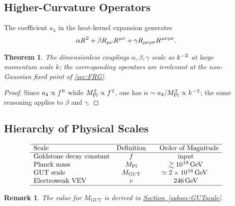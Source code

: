 \documentclass[pdflatex,sn-mathphys-num]{sn-jnl}
\theoremstyle{thmstyleone}
\newtheorem{theorem}{Theorem}
\theoremstyle{thmstyletwo}%
\newtheorem{remark}{Remark}%
\theoremstyle{thmstylethree}%
\newcommand{\sm}{\hspace{.065em}}
\newcommand{\subsecref}[1]{\hyperref[#1]{Section~\ref*{#1}}}
\newcommand{\smexp}[1]{^{\sm #1}}
\begin{document}
\subsection{Higher-Curvature Operators}
\label{subsec:highercurv}

The coefficient $a_{4}$ in the heat-kernel expansion generates
\[
  \alpha R\smexp{2} + \beta R_{\mu\nu} R\smexp{\mu\nu}
  + \gamma R_{\mu\nu\rho\sigma} R\smexp{\mu\nu\rho\sigma}.
\]

\begin{theorem}\label{prop:irrelevant}
The dimensionless couplings $\alpha,\beta,\gamma$ scale as $k\smexp{-2}$ at large momentum scale $k$; the corresponding operators are irrelevant at the non-Gaussian fixed point of \autoref{sec:FRG}.
\end{theorem}

\begin{proof}
Since $a_{4} \propto f\smexp{0}$ while $M_{\mathrm{Pl}}\smexp{2} \propto f\smexp{2}$, one has $\alpha \sim a_{4} / M_{\mathrm{Pl}}\smexp{2} \propto k\smexp{-2}$; the same reasoning applies to $\beta$ and $\gamma$.
\end{proof}

\subsection{Hierarchy of Physical Scales}
\label{subsec:scales}

\[
\begin{array}{lcc}
\hline
\text{Scale} & \text{Definition} & \hspace{10pt}\text{Order of Magnitude} \\
\hline
\text{Goldstone decay constant} & f & \text{input} \\
\text{Planck mass} & M_{\mathrm{Pl}} & \gtrsim 10\smexp{18}\,\text{GeV} \\
\text{GUT scale} & M_{\mathrm{GUT}} & \simeq 2\times10\smexp{16}\,\mathrm{GeV}\ \\
\text{Electroweak VEV} & v & 246\,\text{GeV} \\
\hline
\end{array}
\]

\begin{remark}
  The value for $M_{\mathrm{GUT}}$ is derived in \subsecref{subsec:GUTscale}.
\end{remark}
\end{document}
